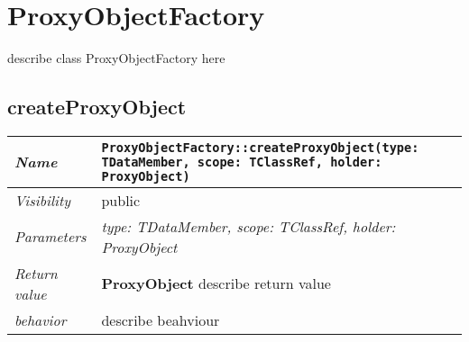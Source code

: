 \chapter{ProxyObjectFactory}
describe class ProxyObjectFactory here
\section{createProxyObject}
\begin{longtable}{p{3cm} @{\hskip 1cm} p{12cm}}
 \hline
\textit{Name} & \texttt{ProxyObjectFactory::createProxyObject(type: TDataMember, scope: TClassRef, holder: ProxyObject)}\\
\hline
 \textit{Visibility} & public\\
\hline
\textit{Parameters} & \textit{type: TDataMember, scope: TClassRef, holder: ProxyObject}\\
\hline
\textit{Return value} & \textbf{ ProxyObject} describe return value\\
  \hline
 \textit{behavior} & describe beahviour \\
\hline
\end{longtable} \pagebreak
 